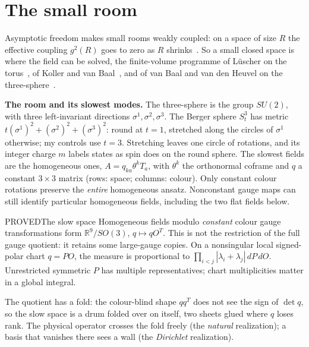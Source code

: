 \section{The small room}

Asymptotic freedom makes small rooms weakly coupled: on a space of size $R$ the effective coupling $g^2(R)$ goes to zero
as $R$ shrinks~\cite{GrossWilczek73,Politzer73}. So a small closed space is where the field can be solved, the finite-volume programme of L\"uscher on the torus~\cite{Luscher83}, of Koller and
van Baal~\cite{KollerVanBaal88}, and of van Baal and van den Heuvel on the three-sphere~\cite{vanBaalvandenHeuvel94,vanBaal00}.

\textbf{The room and its slowest modes.} The three-sphere is the group $SU(2)$, with three left-invariant directions
$\sigma^1,\sigma^2,\sigma^3$. The Berger sphere $S^3_t$ has metric $t(\sigma^1)^2+(\sigma^2)^2+(\sigma^3)^2$: round at
$t=1$, stretched along the circles of $\sigma^1$ otherwise; my controls use $t=3$. Stretching leaves one circle of
rotations, and its integer charge $m$ labels states as spin does on the round sphere. The slowest fields are the
homogeneous ones, $A=q_{ka}\theta^kT_a$, with $\theta^k$ the orthonormal coframe and $q$ a constant $3\times3$ matrix
(rows: space; columns: colour). Only constant colour rotations preserve the \emph{entire} homogeneous ansatz.
Nonconstant gauge maps can still identify particular homogeneous fields, including the two flat fields below.

\begin{claim}{PROVED}{The slow space}\label{b:slow}
Homogeneous fields modulo \emph{constant} colour gauge transformations form $\mathbb R^9/SO(3)$, $q\mapsto qO^T$.
This is not the restriction of the full gauge quotient: it retains some large-gauge copies. On a nonsingular local
signed-polar chart $q=PO$, the measure is proportional to $\prod_{i<j}|\lambda_i+\lambda_j|\,dP\,dO$.
Unrestricted symmetric $P$ has multiple representatives; chart multiplicities matter in a global integral.
\end{claim}

The quotient has a fold: the colour-blind shape $qq^T$ does not see the sign of $\det q$, so the slow space is a drum
folded over on itself, two sheets glued where $q$ loses rank. The physical operator crosses the fold freely (the
\emph{natural} realization); a basis that vanishes there sees a wall (the \emph{Dirichlet} realization).

